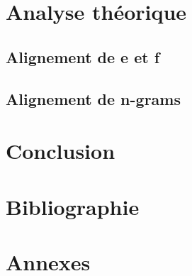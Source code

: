 \documentclass[a4paper,10pt]{article}
\begin{document}
\section{Analyse théorique}

\subsection{Alignement de e et f}

\subsection{Alignement de n-grams}


\section{Conclusion}


\section{Bibliographie}




\section{Annexes}

\end{document}

